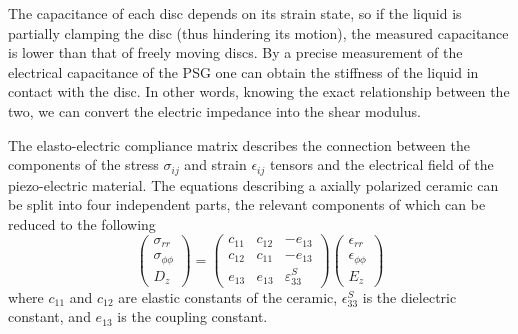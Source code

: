 \documentclass[reprint,showpacs,amsmath,amssymb,aip,jcp]{revtex4-1}
\begin{document}
The capacitance of each disc depends on its strain state, so if the
liquid is partially clamping the disc (thus hindering its motion), the
measured capacitance is lower than that of freely moving discs. By a
precise measurement of the electrical capacitance of the PSG one can
obtain the stiffness of the liquid in contact with the disc. In other
words, knowing the exact relationship between the two, we can convert
the electric impedance into the shear modulus.

The elasto-electric compliance matrix describes the connection between
the components of the stress $\sigma_{ij}$ and strain $\epsilon_{ij}$
tensors and the electrical field of the piezo-electric material. The
equations describing a axially polarized ceramic can be split into
four independent parts, the relevant components of which can be
reduced to the following
\begin{equation}\label{eomatrix}
  \left( \begin{matrix}
      \sigma_{rr} \\  \sigma_{\phi\phi} \\ D_z\end{matrix}
  \right) = \left( \begin{matrix}  c_{11} & c_{12} &
      -e_{13} \\ c_{12} & c_{11} &  -e_{13} \\ e_{13} & e_{13} &
      \varepsilon_{33}^S \end{matrix} \right) \left( \begin{matrix}
      \epsilon_{rr} \\  \epsilon_{\phi\phi} \\ E_z\end{matrix}
  \right)
\end{equation}
where $c_{11}$ and $c_{12}$ are elastic constants of the ceramic,
$\epsilon_{33}^S$ is the dielectric constant, and $e_{13}$ is the
coupling constant.
\end{document}

